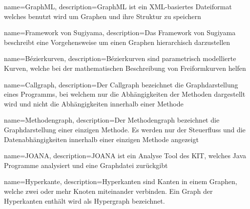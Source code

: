 {
  name=GraphML,
  description={GraphML ist ein XML-basiertes Dateiformat welches benutzt wird um Graphen und ihre Struktur zu speichern}
}

{
  name=Framework von Sugiyama,
  description={Das Framework von Sugiyama beschreibt eine Vorgehensweise um einen Graphen hierarchisch darzustellen}
}

{
  name=Bézierkurven,
  description={Bézierkurven sind parametrisch modellierte Kurven, welche bei der mathematischen Beschreibung von Freiformkurven helfen}
}

{
  name=Callgraph,
  description={Der Callgraph bezeichnet die Graphdarstellung eines Programms, bei welchem nur die Abhängigkeiten der Methoden dargestellt wird und nicht die Abhängigkeiten innerhalb einer Methode}
}

{
  name=Methodengraph,
  description={Der Methodengraph bezeichnet die Graphdarstellung einer einzigen Methode. Es werden nur der Steuerfluss und die Datenabhängigkeiten innerhalb einer einzigen Methode angezeigt}
}

{
  name=JOANA,
  description={JOANA ist ein Analyse Tool des KIT, welches Java Programme analysiert und eine Graphdatei zurückgibt}
}

{
  name=Hyperkante,
  description={Hyperkanten sind Kanten in einem Graphen, welche zwei oder mehr Knoten miteinander verbinden. Ein Graph der Hyperkanten enthält wird als Hypergraph bezeichnet.}
}


